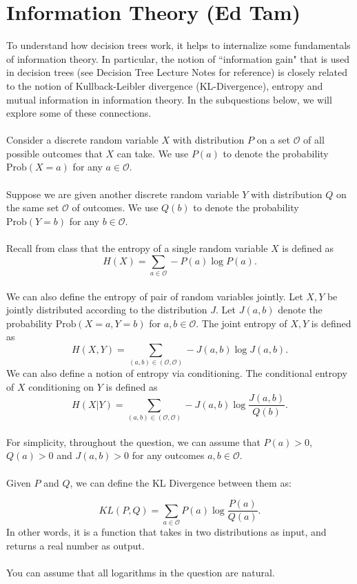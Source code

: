 \documentclass{exam}
\begin{document}
\section{Information Theory (Ed Tam)}
To understand how decision trees work, it helps to internalize some fundamentals of information theory. In particular, the notion of ``information gain" that is used in decision trees (see Decision Tree Lecture Notes for reference) is closely related to the notion of Kullback-Leibler divergence (KL-Divergence), entropy and mutual information in information theory. In the subquestions below, we will explore some of these connections. 
\\\\
Consider a discrete random variable $X$ with distribution $P$ on a set $\mathcal{O}$ of all possible outcomes that $X$ can take. We use $P(a)$ to denote the probability $\text{Prob}(X = a)$ for any $a \in \mathcal{O}$. 
\\\\
Suppose we are given another discrete random variable $Y$ with distribution $Q$ on the same set $\mathcal{O}$ of outcomes. We use $Q(b)$ to denote the probability $\text{Prob}(Y = b)$ for any $b \in \mathcal{O}$. 
\\\\
Recall from class that the entropy of a single random variable $X$ is defined as $$H(X) = \sum_{a \in \mathcal{O}} -P(a) \log P(a).$$  \\
We can also define the entropy of pair of random variables jointly.  Let $X, Y$ be jointly distributed according to the distribution $J$. Let $J(a, b)$ denote the probability $\text{Prob}(X = a, Y = b)$ for $a, b \in \mathcal{O}$. The joint entropy of $X,Y$ is defined as $$H(X,Y) = \sum_{(a, b) \in (\mathcal{O}, \mathcal{O})} -J(a, b) \log J(a, b).$$
We can also define a notion of entropy via conditioning. The conditional entropy of $X$ conditioning on $Y$ is defined as  $$H(X|Y) = \sum_{(a, b) \in (\mathcal{O}, \mathcal{O})} -J(a,b) \log \frac{J(a, b)}{Q(b)}.$$  
\\
For simplicity, throughout the question, we can assume that $P(a) > 0$, $Q(a) > 0$ and $J(a, b) > 0$ for any outcomes $a, b \in \mathcal{O}$.\\\\
Given $P$ and $Q$, we can define the KL Divergence between them as:

$$KL(P, Q) = \sum_{a \in \mathcal{O}} P(a) \log \frac{P(a)}{Q(a)}.$$
In other words, it is a function that takes in two distributions as input, and returns a real number as output. \\\\
You can assume that all logarithms in the question are natural. 
\end{document}
